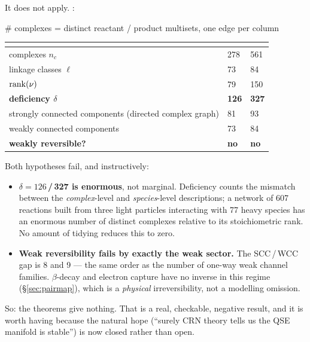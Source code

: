 It does not apply. \derivedhere:

\begin{srclisting}
# complexes = distinct reactant / product multisets, one edge per column
\end{srclisting}

\begin{center}
\begin{tabularx}{\textwidth}{@{}Y L{2.6cm} L{2.6cm}@{}}
\toprule
 & \textbf{} & \textbf{} \\
\midrule
complexes $n_c$ & 278 & 561 \\
linkage classes $\ell$ & 73 & 84 \\
$\operatorname{rank}(\nu)$ & 79 & 150 \\
\textbf{deficiency $\delta$} & \textbf{126} & \textbf{327} \\
strongly connected components (directed complex graph) & 81 & 93 \\
weakly connected components & 73 & 84 \\
\textbf{weakly reversible?} & \textbf{no} & \textbf{no} \\
\bottomrule
\end{tabularx}
\end{center}

Both hypotheses fail, and instructively:

\begin{itemize}
\item \textbf{$\delta = 126$\,/\,327 is enormous}, not marginal. Deficiency
  counts the mismatch between the \emph{complex}-level and \emph{species}-level
  descriptions; a network of 607 reactions built from three light particles
  interacting with 77 heavy species has an enormous number of distinct complexes
  relative to its stoichiometric rank. No amount of tidying reduces this to
  zero.
\item \textbf{Weak reversibility fails by exactly the weak sector.} The
  SCC\,/\,WCC gap is 8 and 9 --- the same order as the number of one-way weak
  channel families. $\beta$-decay and electron capture have no inverse in this
  regime (\S\ref{sec:pairmap}), which is a \emph{physical} irreversibility, not
  a modelling omission.
\end{itemize}

So: the theorems give nothing. That is a real, checkable, negative result, and
it is worth having because the natural hope (``surely CRN theory tells us the
QSE manifold is stable'') is now closed rather than open.

